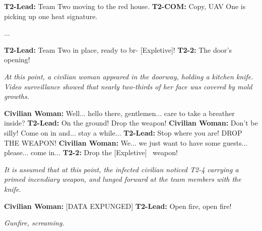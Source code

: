 \begin{leftbar}
\begin{flushleft}

\textbf{T2-Lead:} Team Two moving to the red house.\linebreak
\textbf{T2-COM:} Copy, UAV One is picking up one heat signature.

...

\textbf{T2-Lead:} Team Two in place, ready to br- [Expletive]!\linebreak
\textbf{T2-2:} The door's opening!\linebreak

\textsl{At this point, a civilian woman appeared in the doorway, holding a kitchen knife. Video surveillance showed that nearly two-thirds of her face was covered by mold growths.}\linebreak

\textbf{Civilian Woman:} Well... hello there, gentlemen... care to take a breather inside?\linebreak
\textbf{T2-Lead:} On the ground! Drop the weapon!\linebreak
\textbf{Civilian Woman:} Don't be silly! Come on in and... stay a while...\linebreak
\textbf{T2-Lead:} Stop where you are! DROP THE WEAPON!\linebreak
\textbf{Civilian Woman:} We... we just want to have some guests... please... come in...\linebreak
\textbf{T2-2:} Drop the [Expletive] \ weapon!\linebreak

\textsl{It is assumed that at this point, the infected civilian noticed T2-4 carrying a primed incendiary weapon, and lunged forward at the team members with the knife.}\linebreak

\textbf{Civilian Woman:} [DATA EXPUNGED] \linebreak
\textbf{T2-Lead:} Open fire, open fire!\linebreak

\textsl{Gunfire, screaming.}
\end{flushleft}
\end{leftbar}
